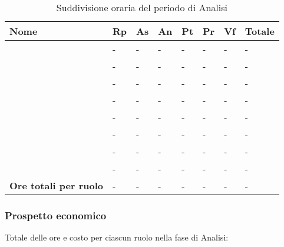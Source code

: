 		\begin{longtable}{ 
			>{\centering}p{} 
			>{\centering}p{}
			>{\centering}p{} 
			>{\centering}p{} 
			>{\centering}p{}
			>{\centering}p{} 
			>{\centering}p{}
			>{\centering\arraybackslash}p{} }
	
			\caption {Suddivisione oraria del periodo di Analisi}		\\
			
			\textbf{\color{white}Nome} & 
			\textbf{\color{white}Rp} & 
			\textbf{\color{white}As} & 
			\textbf{\color{white}An} &
			\textbf{\color{white}Pt} &
			\textbf{\color{white}Pr} &
			\textbf{\color{white}Vf} &
			\textbf{\color{white}Totale}
			\tabularnewline  
			\endhead
			
			\VB & - & - & - & - & - & - & - \\
			\LB & - & - & - & - & - & - & - \\
			\NF & - & - & - & - & - & - & - \\
			\EG & - & - & - & - & - & - & - \\
			\FJ & - & - & - & - & - & - & - \\
			\MP & - & - & - & - & - & - & - \\
			\AS & - & - & - & - & - & - & - \\
			\AZ & - & - & - & - & - & - & - \\
			\textbf{Ore totali per ruolo} & - & - & - & - & - & - & - \\
		\end{longtable}
		
		
	\subsubsection{Prospetto economico}
		Totale delle ore e costo per ciascun ruolo nella fase di Analisi:
		
